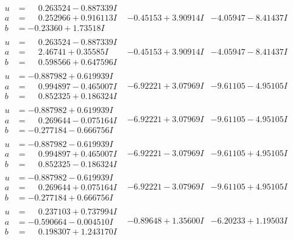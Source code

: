 \documentclass[1p]{elsarticle_modified}
\theoremstyle{definition}
\begin{document}
$$\begin{array}{c|c|c}
\begin{aligned}
u &= \phantom{-}0.263524 - 0.887339 I \\
a &= \phantom{-}0.252966 + 0.916113 I \\
b &= -0.23360 + 1.73518 I\end{aligned}
 & -0.45153 + 3.90914 I & -4.05947 - 8.41437 I \\ \hline\begin{aligned}
u &= \phantom{-}0.263524 - 0.887339 I \\
a &= \phantom{-}2.46741 + 0.35585 I \\
b &= \phantom{-}0.598566 + 0.647596 I\end{aligned}
 & -0.45153 + 3.90914 I & -4.05947 - 8.41437 I \\ \hline\begin{aligned}
u &= -0.887982 + 0.619939 I \\
a &= \phantom{-}0.994897 - 0.465007 I \\
b &= \phantom{-}0.852325 + 0.186324 I\end{aligned}
 & -6.92221 + 3.07969 I & -9.61105 - 4.95105 I \\ \hline\begin{aligned}
u &= -0.887982 + 0.619939 I \\
a &= \phantom{-}0.269644 - 0.075164 I \\
b &= -0.277184 - 0.666756 I\end{aligned}
 & -6.92221 + 3.07969 I & -9.61105 - 4.95105 I \\ \hline\begin{aligned}
u &= -0.887982 - 0.619939 I \\
a &= \phantom{-}0.994897 + 0.465007 I \\
b &= \phantom{-}0.852325 - 0.186324 I\end{aligned}
 & -6.92221 - 3.07969 I & -9.61105 + 4.95105 I \\ \hline\begin{aligned}
u &= -0.887982 - 0.619939 I \\
a &= \phantom{-}0.269644 + 0.075164 I \\
b &= -0.277184 + 0.666756 I\end{aligned}
 & -6.92221 - 3.07969 I & -9.61105 + 4.95105 I \\ \hline\begin{aligned}
u &= \phantom{-}0.237103 + 0.737994 I \\
a &= -0.590664 - 0.004510 I \\
b &= \phantom{-}0.198307 + 1.243170 I\end{aligned}
 & -0.89648 + 1.35600 I & -6.20233 + 1.19503 I \\ \hline\begin{aligned}

\end{aligned}
\end{array}$$
\end{document}

